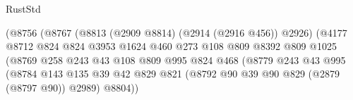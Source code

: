 \begin{lexlean}{RustStd}
\begin{coremodule}
                                            (@8756
                                              (@8767
                                                (@8813 (@2909 @8814) (@2914 (@2916 @456)) @2926)
                                                (@4177
                                                  @8712
                                                  @824
                                                  @824
                                                  @3953
                                                  @1624
                                                  @460
                                                  @273
                                                  @108
                                                  @809
                                                  @8392
                                                  @809
                                                  @1025
                                                  (@8769
                                                    @258
                                                    @243
                                                    @43
                                                    @108
                                                    @809
                                                    @995
                                                    @824
                                                    @468
                                                    (@8779
                                                      @243
                                                      @43
                                                      @995
                                                      (@8784
                                                        @143
                                                        @135
                                                        @39
                                                        @42
                                                        @829
                                                        @821
                                                        (@8792
                                                          @90
                                                          @39
                                                          @90
                                                          @829
                                                          (@2879 (@8797 @90))
                                                          @2989)
                                                        @8804))

\end{coremodule}
\end{lexlean}
